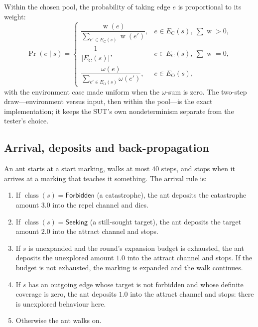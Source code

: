 \documentclass[11pt,a4paper]{article}
\newcommand{\cls}{\operatorname{class}}
\newcommand{\wgt}{\operatorname{w}}
\begin{document}
Within the chosen pool, the probability of taking edge $e$ is proportional to
its weight:
\[
  \Pr(e\mid s)=
  \begin{cases}
    \dfrac{\wgt(e)}{\sum_{e'\in E_{\mathrm{C}}(s)}\wgt(e')},
      & e\in E_{\mathrm{C}}(s),\ \sum\wgt>0,\\[3mm]
    \dfrac{1}{|E_{\mathrm{C}}(s)|}, & e\in E_{\mathrm{C}}(s),\ \sum\wgt=0,\\[3mm]
    \dfrac{\omega(e)}{\sum_{e'\in E_{\mathrm{O}}(s)}\omega(e')},
      & e\in E_{\mathrm{O}}(s),
  \end{cases}
\]
with the environment case made uniform when the $\omega$-sum is zero.  The
two-step draw---environment versus input, then within the pool---is the exact
implementation; it keeps the SUT's own nondeterminism separate from the
tester's choice.

\subsection{Arrival, deposits and back-propagation}\label{sec:deposits}

An ant starts at a start marking, walks at most $40$ steps, and stops when
it arrives at a marking that teaches it something.  The arrival rule is:

\begin{enumerate}[label=(\roman*),leftmargin=2.2em]
  \item If $\cls(s)=\mathsf{Forbidden}$ (a catastrophe), the ant deposits the
        catastrophe amount $3.0$ into the repel channel and dies.
  \item If $\cls(s)=\mathsf{Seeking}$ (a still-sought target), the ant
        deposits the target amount $2.0$ into the attract channel and stops.
  \item If $s$ is unexpanded and the round's expansion budget is exhausted,
        the ant deposits the unexplored amount $1.0$ into the attract channel
        and stops.  If the budget is not exhausted, the marking is expanded
        and the walk continues.
  \item If $s$ has an outgoing edge whose target is not forbidden and whose
        definite coverage is zero, the ant deposits $1.0$ into the attract
        channel and stops: there is unexplored behaviour here.
  \item Otherwise the ant walks on.
\end{enumerate}
\end{document}
